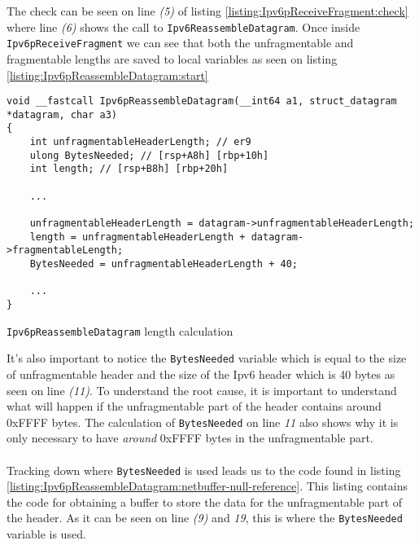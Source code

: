 \documentclass{report}
\begin{document}
The check can be seen on line \emph{(5)} of listing \ref{listing:Ipv6pReceiveFragment:check} where line \emph{(6)} shows the call to \texttt{Ipv6ReassembleDatagram}. Once inside \texttt{Ipv6pReceiveFragment} we can see that both the unfragmentable and fragmentable lengths are saved to local variables as seen on listing \ref{listing:Ipv6pReassembleDatagram:start}

\begin{listing}[H]
\begin{verbatim}
void __fastcall Ipv6pReassembleDatagram(__int64 a1, struct_datagram *datagram, char a3)
{
    int unfragmentableHeaderLength; // er9
    ulong BytesNeeded; // [rsp+A8h] [rbp+10h]
    int length; // [rsp+B8h] [rbp+20h]

    ...

    unfragmentableHeaderLength = datagram->unfragmentableHeaderLength;
    length = unfragmentableHeaderLength + datagram->fragmentableLength;
    BytesNeeded = unfragmentableHeaderLength + 40;

    ...
}
\end{verbatim}
\caption{\texttt{Ipv6pReassembleDatagram} length calculation}
\label{listing:Ipv6pReassembleDatagram:start}
\end{listing}

It's also important to notice the \texttt{BytesNeeded} variable which is equal to the size of unfragmentable header and the size of the Ipv6 header which is 40 bytes as seen on line \emph{(11)}. To understand the root cause, it is important to understand what will happen if the unfragmentable part of the header contains around 0xFFFF bytes. The calculation of \texttt{BytesNeeded} on line \emph{11} also shows why it is only necessary to have \emph{around} 0xFFFF bytes in the unfragmentable part.
\\
\\
Tracking down where \texttt{BytesNeeded} is used leads us to the code found in listing \ref{listing:Ipv6pReassembleDatagram:netbuffer-null-reference}. This listing contains the code for obtaining a buffer to store the data for the unfragmentable part of the header. As it can be seen on line \emph{(9)} and \emph{19}, this is where the \texttt{BytesNeeded} variable is used.
\end{document}
